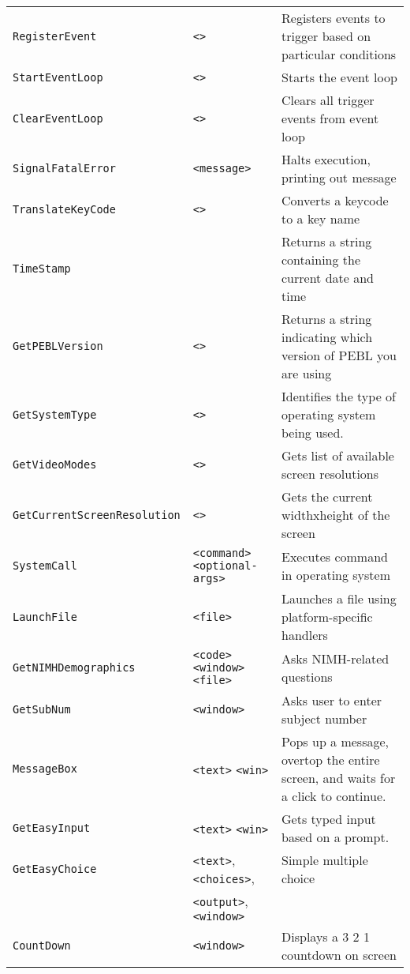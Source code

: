 \begin{longtable}{p{3cm}p{3cm}p{6cm}}
\verb+RegisterEvent+ &\verb+<>+ &Registers events to trigger based on particular conditions\\ 
\verb+StartEventLoop+ &\verb+<>+ &Starts the event loop\\ 
\verb+ClearEventLoop+ &\verb+<>+ &Clears all trigger events from event loop\\ 
\verb+SignalFatalError+ &\verb+<message>+ & Halts execution, printing out message \\ 
\verb+TranslateKeyCode+ &\verb+<>+ &Converts a keycode to a key name\\ 
\verb+TimeStamp+ & &Returns a string containing the current date and time\\ 
\verb+GetPEBLVersion+ &\verb+<>+ &Returns a string indicating which version of PEBL you are using\\ 
\verb+GetSystemType+ &\verb+<>+ &Identifies the type of operating system being used.\\ 
\verb+GetVideoModes+&\verb+<>+& Gets list of available screen resolutions\\
\verb+GetCurrentScreenResolution+&\verb+<>+& Gets the current widthxheight of the screen\\
\verb+SystemCall+ &\verb+<command>+ \verb+<optional-args>+ &Executes command in operating system\\ 
\verb+LaunchFile+ & \verb+<file>+&Launches a file using platform-specific handlers\\
\verb+GetNIMHDemographics+ & \hspace{0.7cm}\verb+<code>+ \verb+<window>+ \verb+<file>+ & Asks NIMH-related questions\\ 
\verb+GetSubNum+ & \verb+<window>+ & Asks user to enter subject number\\
\verb+MessageBox+ &\verb+<text>+ \verb+<win>+&Pops up a message, overtop the entire screen, and waits for a click to continue.\\
\verb+GetEasyInput+&\verb+<text>+ \verb+<win>+&Gets typed input based on a prompt.\\
\verb+GetEasyChoice+&\verb+<text>+, \verb+<choices>+, &Simple multiple choice \\
                   &\verb+<output>+, \verb+<window>+ &\\
\verb+CountDown+&\verb+<window>+&Displays a 3 2 1 countdown on screen\\


\end{longtable}
